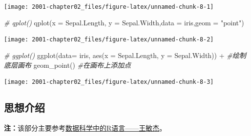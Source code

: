 \documentclass[
]{book}
\newenvironment{Shaded}{\begin{snugshade}}{\end{snugshade}}
\newcommand{\AttributeTok}[1]{\textcolor[rgb]{0.77,0.63,0.00}{#1}}
\newcommand{\CommentTok}[1]{\textcolor[rgb]{0.56,0.35,0.01}{\textit{#1}}}
\newcommand{\FunctionTok}[1]{\textcolor[rgb]{0.00,0.00,0.00}{#1}}
\newcommand{\NormalTok}[1]{#1}
\newcommand{\SpecialCharTok}[1]{\textcolor[rgb]{0.00,0.00,0.00}{#1}}
\newcommand{\StringTok}[1]{\textcolor[rgb]{0.31,0.60,0.02}{#1}}
\begin{document}
\begin{Shaded}
\end{Shaded}

\begin{center}\texttt{[image: 2001-chapter02\_files/figure-latex/unnamed-chunk-8-1]} \end{center}

\begin{Shaded}
\begin{Highlighting}[]
\CommentTok{\# qplot()}
\FunctionTok{qplot}\NormalTok{(}\AttributeTok{x =}\NormalTok{ Sepal.Length, }\AttributeTok{y =}\NormalTok{ Sepal.Width,}\AttributeTok{data =}\NormalTok{ iris,}\AttributeTok{geom =} \StringTok{"point"}\NormalTok{)}
\end{Highlighting}
\end{Shaded}

\begin{center}\texttt{[image: 2001-chapter02\_files/figure-latex/unnamed-chunk-8-2]} \end{center}

\begin{Shaded}
\begin{Highlighting}[]
\CommentTok{\# ggplot()}
\FunctionTok{ggplot}\NormalTok{(}\AttributeTok{data=}\NormalTok{ iris, }\FunctionTok{aes}\NormalTok{(}\AttributeTok{x =}\NormalTok{ Sepal.Length, }\AttributeTok{y =}\NormalTok{ Sepal.Width)) }\SpecialCharTok{+}  \CommentTok{\#绘制底层画布}
\FunctionTok{geom\_point}\NormalTok{()  }\CommentTok{\#在画布上添加点}
\end{Highlighting}
\end{Shaded}

\begin{center}\texttt{[image: 2001-chapter02\_files/figure-latex/unnamed-chunk-8-3]} \end{center}

\hypertarget{ux601dux60f3ux4ecbux7ecd}{%
\subsection{思想介绍}\label{ux601dux60f3ux4ecbux7ecd}}

\textbf{注：}该部分主要参考\href{https://bookdown.org/wangminjie/R4DS/intro-R.html\#\%E5\%AE\%89\%E8\%A3\%85-rstudio}{数据科学中的R语言------王敏杰}。
\end{document}
